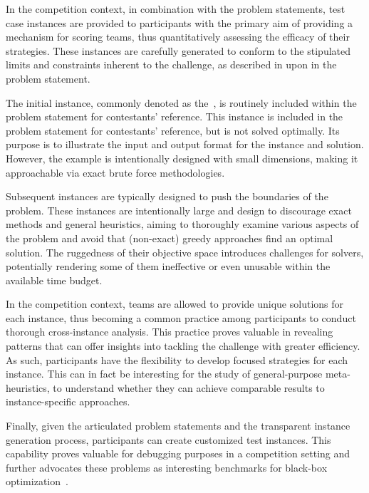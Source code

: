 In the competition context, in combination with the problem statements, test
case instances are provided to participants with the primary aim of providing a
mechanism for scoring teams, thus quantitatively assessing the efficacy of their
strategies. These instances are carefully generated to conform to the stipulated
limits and constraints inherent to the challenge, as described in upon in the
problem statement.

The initial instance, commonly denoted as the~, is routinely
included within the problem statement for contestants' reference. This instance
is included in the problem statement for contestants' reference, but is not
solved optimally. Its purpose is to illustrate the input and output format for
the instance and solution. However, the example is intentionally designed with
small dimensions, making it approachable via exact brute force methodologies.

Subsequent instances are typically designed to push the boundaries of the problem.
These instances are intentionally large and design to discourage exact methods
and general heuristics, aiming to thoroughly examine various aspects of the
problem and avoid that (non-exact) greedy approaches find an optimal solution.
The ruggedness of their objective space introduces challenges for solvers,
potentially rendering some of them ineffective or even unusable within the
available time budget.

In the competition context, teams are allowed to provide unique solutions for
each instance, thus becoming a common practice among participants to conduct
thorough cross-instance analysis. This practice proves valuable in revealing
patterns that can offer insights into tackling the challenge with greater
efficiency. As such, participants have the flexibility to develop focused
strategies for each instance. This can in fact be interesting for the study of
general-purpose meta-heuristics, to understand whether they can achieve
comparable results to instance-specific approaches.

Finally, given the articulated problem statements and the transparent instance
generation process, participants can create customized test instances. This
capability proves valuable for debugging purposes in a competition setting and
further advocates these problems as interesting benchmarks for black-box
optimization~\cite{bartz-beielstein2020benchmarking}.